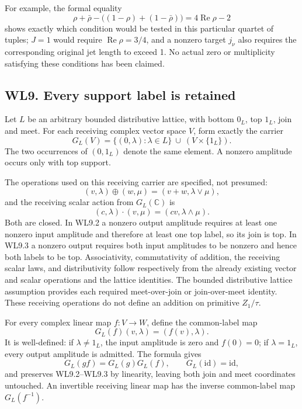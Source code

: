For example, the formal equality \[
 \rho+\bar\rho-\bigl((1-\rho)+(1-\bar\rho)\bigr)=4\operatorname{Re}\rho-2
\] shows exactly which condition would be tested in this particular
quartet of tuples; \(J=1\) would require \(\operatorname{Re}\rho=3/4\),
and a nonzero target \(j_\nu\) also requires the corresponding original
jet length to exceed 1. No actual zero or multiplicity satisfying these
conditions has been claimed.

\subsection{WL9. Every support label is
retained}\label{wl9.-every-support-label-is-retained}

Let \(L\) be an arbitrary bounded distributive lattice, with bottom
\(0_L\), top \(1_L\), join and meet. For each receiving complex vector
space \(V\), form exactly the carrier \[
 G_L(V)=\{(0,\lambda):\lambda\in L\}
       \ \cup\ (V\times\{1_L\}).
\tag{WL9.1}
\] The two occurrences of \((0,1_L)\) denote the same element. A nonzero
amplitude occurs only with top support.

The operations used on this receiving carrier are specified, not
presumed: \[
 (v,\lambda)\oplus(w,\mu)=(v+w,\lambda\vee\mu),
\tag{WL9.2}
\] and the receiving scalar action from \(G_L(\mathbb C)\) is \[
 (c,\lambda)\cdot(v,\mu)=(cv,\lambda\wedge\mu).
\tag{WL9.3}
\] Both are closed. In WL9.2 a nonzero output amplitude requires at
least one nonzero input amplitude and therefore at least one top label,
so its join is top. In WL9.3 a nonzero output requires both input
amplitudes to be nonzero and hence both labels to be top. Associativity,
commutativity of addition, the receiving scalar laws, and distributivity
follow respectively from the already existing vector and scalar
operations and the lattice identities. The bounded distributive lattice
assumption provides each required meet-over-join or join-over-meet
identity. These receiving operations do not define an addition on
primitive \(Z_1/\tau\).

For every complex linear map \(f:V\to W\), define the common-label map
\[
 G_L(f)(v,\lambda)=(f(v),\lambda).
\tag{WL9.4}
\] It is well-defined: if \(\lambda\ne1_L\), the input amplitude is zero
and \(f(0)=0\); if \(\lambda=1_L\), every output amplitude is admitted.
The formula gives \[
 G_L(gf)=G_L(g)G_L(f),\qquad
 G_L(\mathrm{id})=\mathrm{id},
\tag{WL9.5}
\] and preserves WL9.2--WL9.3 by linearity, leaving both join and meet
coordinates untouched. An invertible receiving linear map has the
inverse common-label map \(G_L(f^{-1})\).

